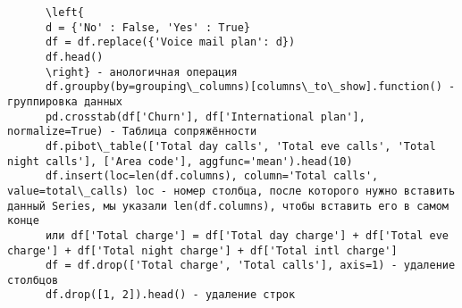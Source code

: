 \documentclass{article}
\begin{document}
\begin{lstlisting}
      \left{
      d = {'No' : False, 'Yes' : True}
      df = df.replace({'Voice mail plan': d})
      df.head()
      \right} - анологичная операция
      df.groupby(by=grouping\_columns)[columns\_to\_show].function() - группировка данных
      pd.crosstab(df['Churn'], df['International plan'], normalize=True) - Таблица сопряжённости
      df.pibot\_table(['Total day calls', 'Total eve calls', 'Total night calls'], ['Area code'], aggfunc='mean').head(10)
      df.insert(loc=len(df.columns), column='Total calls', value=total\_calls) loc - номер столбца, после которого нужно вставить данный Series, мы указали len(df.columns), чтобы вставить его в самом конце
      или df['Total charge'] = df['Total day charge'] + df['Total eve charge'] + df['Total night charge'] + df['Total intl charge']
      df = df.drop(['Total charge', 'Total calls'], axis=1) - удаление столбцов 
      df.drop([1, 2]).head() - удаление строк
   \end{lstlisting}
\end{document}
